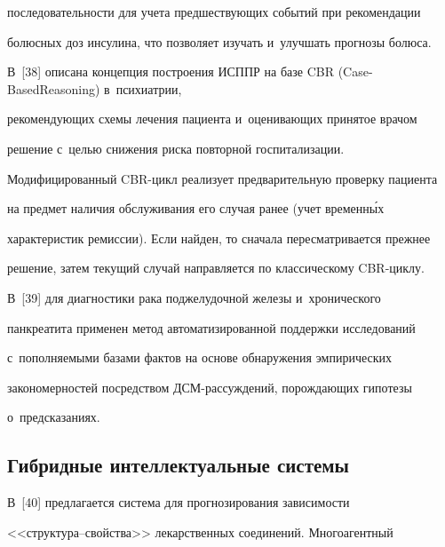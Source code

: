 последовательности для учета предшествующих событий при рекомендации 

болюсных доз инсулина, что позволяет изучать и~улучшать прогнозы болюса.

  

  В~[38] описана концепция построения ИСППР на базе CBR (Case-Based\linebreak Reasoning) в~психиатрии, 

рекомендующих схемы лечения пациента и~оценивающих принятое врачом 

решение с~целью снижения риска повторной госпитализации. 

Модифицированный CBR-цикл реализует предварительную проверку пациента 

на предмет наличия обслуживания его случая ранее (учет \mbox{временн\'{ы}х} 

характеристик ремиссии). Если найден, то сначала пересматривается прежнее 

решение, затем текущий случай направляется по классическому CBR-циклу.

{



} 

  

  В~[39] для диагностики рака поджелудочной железы и~хронического 

панкреатита применен метод автоматизированной поддержки исследований 

с~пополняемыми базами фактов на основе обнаружения эмпирических 

закономерностей посредством ДСМ-рас\-суж\-де\-ний, порождающих гипотезы 

о~предсказаниях. 




  

  \subsection{Гибридные интеллектуальные системы}

  


  

  В~[40] предлагается система для прогнозирования зависимости  

<<струк\-ту\-ра--свой\-ст\-ва>> лекарственных соединений. Многоагентный 

